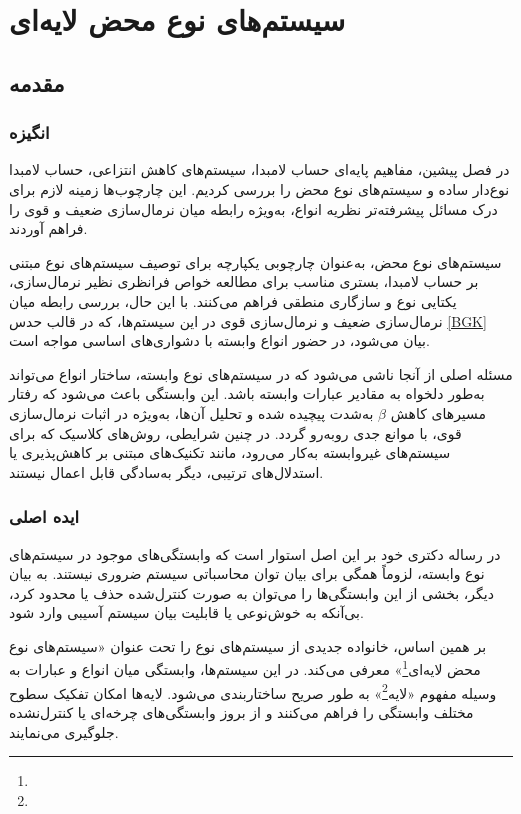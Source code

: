 \chapter{سیستم‌های نوع محض لایه‌ای}\label{S2}
\pagestyle{plain}

\section{مقدمه}

\subsection*{انگیزه}

در فصل پیشین، مفاهیم پایه‌ای حساب لامبدا، سیستم‌های کاهش انتزاعی، حساب لامبدا نوع‌دار ساده و سیستم‌های نوع محض را بررسی کردیم.
این چارچوب‌ها زمینه لازم برای درک مسائل پیشرفته‌تر نظریه انواع، به‌ویژه رابطه میان نرمال‌سازی ضعیف و قوی را فراهم آوردند.

سیستم‌های نوع محض، به‌عنوان چارچوبی یکپارچه برای توصیف سیستم‌های نوع مبتنی بر حساب لامبدا، بستری مناسب برای مطالعه خواص فرانظری نظیر نرمال‌سازی، یکتایی نوع و سازگاری منطقی فراهم می‌کنند.
با این حال، بررسی رابطه میان نرمال‌سازی ضعیف و نرمال‌سازی قوی در این سیستم‌ها، که در قالب حدس
\ref{BGK}
بیان می‌شود، در حضور انواع وابسته با دشواری‌های اساسی مواجه است.

مسئله اصلی از آنجا ناشی می‌شود که در سیستم‌های نوع وابسته، ساختار انواع می‌تواند به‌طور دلخواه به مقادیر عبارات وابسته باشد.
این وابستگی باعث می‌شود که رفتار مسیرهای کاهش
$\beta$
به‌شدت پیچیده شده و تحلیل آن‌ها، به‌ویژه در اثبات نرمال‌سازی قوی، با موانع جدی روبه‌رو گردد. در چنین شرایطی، روش‌های کلاسیک که برای سیستم‌های غیروابسته به‌کار می‌رود، مانند تکنیک‌های مبتنی بر کاهش‌پذیری یا استدلال‌های ترتیبی، دیگر به‌سادگی قابل اعمال نیستند.

\subsection*{ایده اصلی}

در رساله دکتری خود
\cite{mull2023}
بر این اصل استوار است که وابستگی‌های موجود در سیستم‌های نوع وابسته، لزوماً همگی برای بیان توان محاسباتی سیستم ضروری نیستند.
به بیان دیگر، بخشی از این وابستگی‌ها را می‌توان به صورت کنترل‌شده حذف یا محدود کرد، بی‌آنکه به خوش‌نوعی یا قابلیت بیان سیستم آسیبی وارد شود.

بر همین اساس،
خانواده جدیدی از سیستم‌های نوع را تحت عنوان «سیستم‌های نوع محض لایه‌ای\footnote{}»
معرفی می‌کند. در این سیستم‌ها، وابستگی میان انواع و عبارات به وسیله مفهوم «لایه\footnote{}» به طور صریح ساختاربندی می‌شود. لایه‌ها امکان تفکیک سطوح مختلف وابستگی را فراهم می‌کنند و از بروز وابستگی‌های چرخه‌ای یا کنترل‌نشده جلوگیری می‌نمایند.

